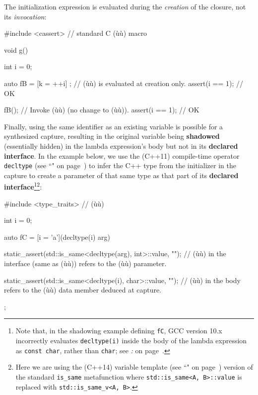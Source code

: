 \noindent The initialization expression is evaluated during the \emph{creation} of
the closure, not its \emph{invocation}:

\begin{emcppslisting}[emcppsstandards={c++14}]
#include <cassert>  // standard C (ù{}ù) macro

void g()
{
    int i = 0;

    auto fB = [k = ++i]{ };  // (ù{}ù) is evaluated at creation only.
    assert(i == 1);  // OK

    fB();  // Invoke (ù{}ù) (no change to (ù{}ù)).
    assert(i == 1);  // OK
}
\end{emcppslisting}
    
\noindent Finally, using the same identifier as an existing
variable is possible for a synthesized capture, resulting in the original variable
being \textbf{shadowed} (essentially hidden) in the lambda expression's
body but not in its \textbf{declared interface}. In the example below,
we use the (C++11) compile-time operator
\texttt{decltype} (see ``" on page~\pageref{decltype}) to infer the C++ type from the
initializer in the capture to create a parameter of that same type as
that part of its \textbf{declared interface}{\cprotect\footnote{Note
that, in the shadowing example defining \texttt{fC}, GCC version 10.x
incorrectly evaluates \texttt{decltype(i)} inside the body of the
lambda expression as \texttt{const}~\texttt{char}, rather than
  \texttt{char}; see \textit{: } on page~\pageref{potential-pitfalls-lambdacapture}.}}{\cprotect\footnote{Here we are using the (C++14) variable
  template (see ``" on page~\pageref{variable-templates}) version of the standard \texttt{is\_same} metafunction where \texttt{std::is\_same<A,}~\texttt{B>::value} is replaced with
  \texttt{std::is\_same\_v<A,}~\texttt{B>}.}}:

\begin{emcppslisting}[emcppserrorlines={10},emcppsstandards={c++14}]
#include <type_traits>  // (ù{}ù)

int i = 0;

auto fC = [i = 'a'](decltype(i) arg)
{
    static_assert(std::is_same<decltype(arg), int>::value, "");
         // (ù{}ù) in the interface (same as (ù{}ù)) refers to the (ù{}ù) parameter.

    static_assert(std::is_same<decltype(i), char>::value, "");
        // (ù{}ù) in the body refers to the (ù{}ù) data member deduced at capture.
};
\end{emcppslisting}
    
